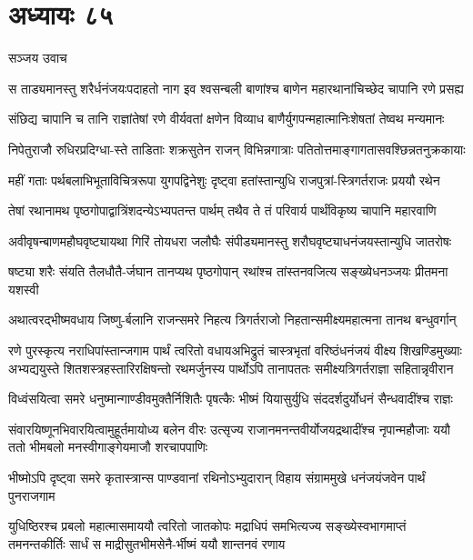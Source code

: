 \chapter{अध्यायः ८५}
\twolineshloka
{सञ्जय उवाच}
{}


\twolineshloka
{स ताड्यमानस्तु शरैर्धनंजयःपदाहतो नाग इव श्वसन्बली}
{बाणांश्च बाणेन महारथानांचिच्छेद चापानि रणे प्रसह्य}


\twolineshloka
{संछिद्य चापानि च तानि राज्ञांतेषां रणे वीर्यवतां क्षणेन}
{विव्याध बाणैर्युगपन्महात्मानिःशेषतां तेष्वथ मन्यमानः}


\twolineshloka
{निपेतुराजौ रुधिरप्रदिग्धा-स्ते ताडिताः शक्रसुतेन राजन्}
{विभिन्नगात्राः पतितोत्तमाङ्गागतासवश्छिन्नतनुक्रकायाः}


\twolineshloka
{महीं गताः पर्थबलाभिभूताविचित्ररूपा युगपद्विनेशुः}
{दृष्ट्वा हतांस्तान्युधि राजपुत्रां-स्त्रिगर्तराजः प्रययौ रथेन}


\twolineshloka
{तेषां रथानामथ पृष्ठगोपाद्वात्रिंशदन्येऽभ्यपतन्त पार्थम्}
{तथैव ते तं परिवार्य पार्थंविकृष्य चापानि महारवाणि}


\twolineshloka
{अवीवृषन्बाणमहौघवृष्ट्यायथा गिरिं तोयधरा जलौघैः}
{संपीड्यमानस्तु शरौघवृष्ट्याधनंजयस्तान्युधि जातरोषः}


\twolineshloka
{षष्ट्या शरैः संयति तैलधौतै-र्जघान तानप्यथ पृष्ठगोपान्}
{रथांश्च तांस्तनवजित्य सङ्ख्येधनञ्जयः प्रीतमना यशस्वी}


\twolineshloka
{अथात्वरद्भीष्मवधाय जिष्णु-र्बलानि राजन्समरे निहत्य}
{त्रिगर्तराजो निहतान्समीक्ष्यमहात्मना तानथ बन्धुवर्गान्}


रणे पुरस्कृत्य नराधिपांस्तान्जगाम पार्थं त्वरितो वधायअभिद्रुतं चास्त्रभृतां वरिष्ठंधनंजयं वीक्ष्य शिखण्डिमुख्याः
\twolineshloka
{अभ्यद्ययुस्ते शितशस्त्रहस्तारिरक्षिषन्तो रथमर्जुनस्य}
{पार्थोऽपि तानापततः समीक्ष्यत्रिगर्तराज्ञा सहितान्नृवीरान}


\twolineshloka
{विध्वंसयित्वा समरे धनुष्मान्गाण्डीवमुक्तैर्निशितैः पृषत्कैः}
{भीष्मं यियासुर्युधि संददर्शदुर्योधनं सैन्धवादींश्च राज्ञः}


\threelineshloka
{संवारयिष्णूनभिवारयित्वामुहूर्तमायोध्य बलेन वीरः}
{उत्सृज्य राजानमनन्तवीर्योजयद्रथादींश्च नृपान्महौजाः}
{ययौ ततो भीमबलो मनस्वीगाङ्गेयमाजौ शरचापपाणिः}


\twolineshloka
{भीष्मोऽपि दृष्ट्वा समरे कृतास्त्रान्स पाण्डवानां रथिनोऽभ्युदारान्}
{विहाय संग्राममुखे धनंजयंजवेन पार्थं पुनराजगाम}


\threelineshloka
{युधिष्ठिरश्च प्रबलो महात्मासमाययौ त्वरितो जातकोपः}
{मद्राधिपं समभित्यज्य सङ्ख्येस्वभागमाप्तं तमनन्तकीर्तिः}
{सार्धं स माद्रीसुतभीमसेनै-र्भीष्मं ययौ शान्तनवं रणाय}



